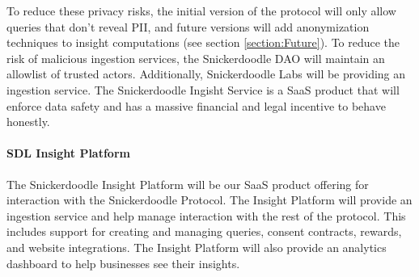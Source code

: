 To reduce these privacy risks, the initial version of the protocol will only allow queries that don't reveal PII, and future versions will add anonymization 
techniques to insight computations (see section \ref{section:Future}). To reduce the risk of malicious ingestion services, the Snickerdoodle DAO will maintain 
an allowlist of trusted actors. Additionally, Snickerdoodle Labs will be providing an ingestion service. The Snickerdoodle Ingisht Service is a SaaS product 
that will enforce data safety and has a massive financial and legal incentive to behave honestly.

\paragraph{SDL Insight Platform}
\label{section:InsightService}

The Snickerdoodle Insight Platform will be our SaaS product offering for interaction with the Snickerdoodle Protocol. The Insight Platform will provide an 
ingestion service and help manage interaction with the rest of the protocol. This includes support for creating and managing queries, consent contracts, 
rewards, and website integrations. The Insight Platform will also provide an analytics dashboard to help businesses see their insights.